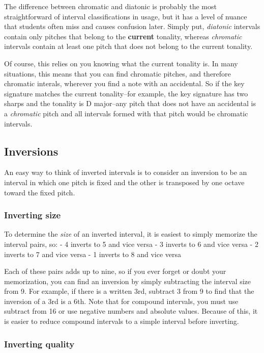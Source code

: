 \documentclass{book}
\begin{document}
The difference between chromatic and diatonic is probably the most
straightforward of interval classifications in usage, but it has a level of
nuance that students often miss and causes confusion later. Simply put,
\emph{diatonic} intervals contain only pitches that belong to the
\textbf{current} tonality, whereas \emph{chromatic} intervals contain at least
one pitch that does not belong to the current tonality.

Of course, this relies on you knowing what the current tonality is. In many
situations, this means that you can find chromatic pitches, and therefore
chromatic interals, wherever you find a note with an accidental. So if the key
signature matches the current tonality--for example, the key signature has two
sharps and the tonality is D major--any pitch that does not have an accidental
is a \emph{chromatic} pitch and all intervals formed with that pitch would be
chromatic intervals.

\hypertarget{inversions-1}{%
\subsection{Inversions}\label{inversions-1}}

An easy way to think of inverted intervals is to consider an inversion to be
an interval in which one pitch is fixed and the other is transposed by one
octave toward the fixed pitch.

\hypertarget{inverting-size}{%
\subsubsection{Inverting size}\label{inverting-size}}

To determine the \emph{size} of an inverted interval, it is easiest to simply
memorize the interval pairs, so: - 4 inverts to 5 and vice versa - 3 inverts
to 6 and vice versa - 2 inverts to 7 and vice versa - 1 inverts to 8 and vice
versa

Each of these pairs adds up to nine, so if you ever forget or doubt your
memorization, you can find an inversion by simply subtracting the interval
size from 9. For example, if there is a written 3rd, subtract 3 from 9 to find
that the inversion of a 3rd is a 6th. Note that for compound intervals, you
must use subtract from 16 or use negative numbers and absolute values. Because
of this, it is easier to reduce compound intervals to a simple interval before
inverting.

\hypertarget{inverting-quality}{%
\subsubsection{Inverting quality}\label{inverting-quality}}
\end{document}
